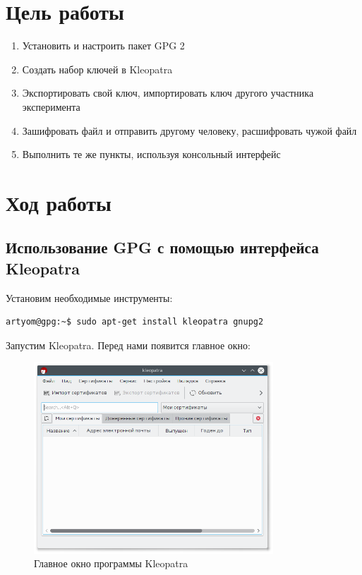\section{Цель работы}

\begin{enumerate}
	\item Установить и настроить пакет GPG 2
	\item Создать набор ключей в Kleopatra
	\item Экспортировать свой ключ, импортировать ключ другого участника эксперимента
	\item Зашифровать файл и отправить другому человеку, расшифровать чужой файл
	\item Выполнить те же пункты, используя консольный интерфейс
\end{enumerate}

\section{Ход работы}

\subsection{Использование GPG с помощью интерфейса Kleopatra}

Установим необходимые инструменты:

\begin{lstlisting}[language=bash,caption={Установка GPG}]
artyom@gpg:~$ sudo apt-get install kleopatra gnupg2
\end{lstlisting}

Запустим Kleopatra. Перед нами появится главное окно:

\begin{figure}[H]
	\centering
	\includegraphics[width=0.8\textwidth]{figures/screen1.png}
	\caption{Главное окно программы Kleopatra}
\end{figure}

